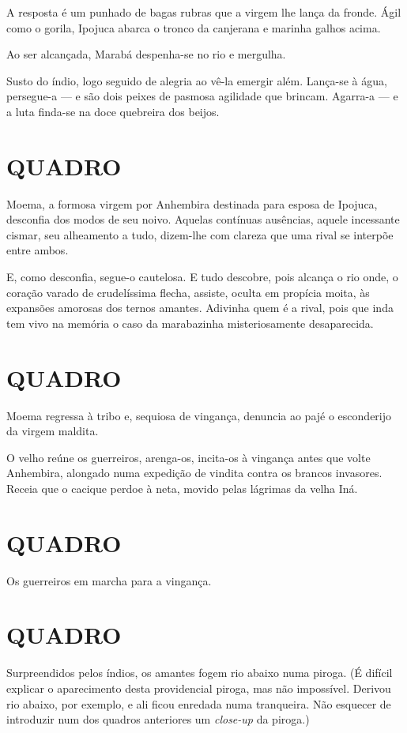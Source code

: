 A resposta é um punhado de bagas rubras que a virgem lhe lança da
fronde. Ágil como o gorila, Ipojuca abarca o tronco da canjerana e
marinha galhos acima.

Ao ser alcançada, Marabá despenha-se no rio e mergulha.

Susto do índio, logo seguido de alegria ao vê-la emergir além. Lança-se
à água, persegue-a --- e são dois peixes de pasmosa agilidade que
brincam. Agarra-a --- e a luta finda-se na doce quebreira dos beijos.

\section{QUADRO}

Moema, a formosa virgem por Anhembira destinada para esposa de Ipojuca,
desconfia dos modos de seu noivo. Aquelas contínuas ausências, aquele
incessante cismar, seu alheamento a tudo, dizem-lhe com clareza que uma
rival se interpõe entre ambos.

E, como desconfia, segue-o cautelosa. E tudo descobre, pois alcança o
rio onde, o coração varado de crudelíssima flecha, assiste, oculta em
propícia moita, às expansões amorosas dos ternos amantes. Adivinha quem
é a rival, pois que inda tem vivo na memória o caso da marabazinha
misteriosamente desaparecida.

\section{QUADRO}

Moema regressa à tribo e, sequiosa de vingança, denuncia ao pajé o
esconderijo da virgem maldita.

O velho reúne os guerreiros, arenga-os, incita-os à vingança antes que
volte Anhembira, alongado numa expedição de vindita contra os brancos
invasores. Receia que o cacique perdoe à neta, movido pelas lágrimas da
velha Iná.

\section{QUADRO}

Os guerreiros em marcha para a vingança.

\section{QUADRO}

Surpreendidos pelos índios, os amantes fogem rio abaixo numa piroga. (É
difícil explicar o aparecimento desta providencial piroga, mas não
impossível. Derivou rio abaixo, por exemplo, e ali ficou enredada numa
tranqueira. Não esquecer de introduzir num dos quadros anteriores um
\emph{close-up} da piroga.)

